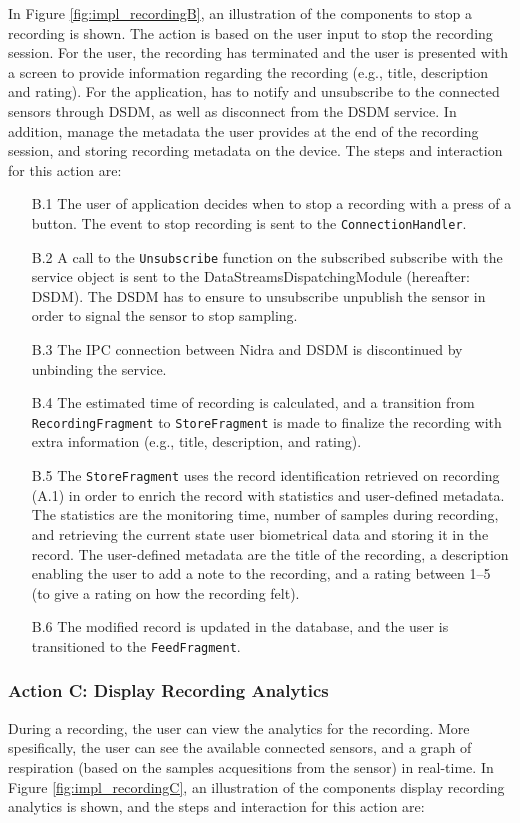 In Figure \ref{fig:impl_recordingB}, an illustration of the components to stop a recording is shown. The action is based on the user input to stop the recording session. For the user, the recording has terminated and the user is presented with a screen to provide information regarding the recording (e.g., title, description and rating). For the application, has to notify and unsubscribe to the connected sensors through DSDM, as well as disconnect from the DSDM service. In addition, manage the metadata the user provides at the end of the recording session, and storing recording metadata on the device. The steps and interaction for this action are:

\begin{itemize}
	\item[B.1] The user of application decides when to stop a recording with a press of a button. The event to stop recording is sent to the \verb|ConnectionHandler|.
	\item[B.2] A call to the \verb|Unsubscribe| function on the subscribed subscribe with the service object is sent to the DataStreamsDispatchingModule (hereafter: DSDM). The DSDM has to ensure to unsubscribe unpublish the sensor in order to signal the sensor to stop sampling. 
	\item[B.3] The IPC connection between Nidra and DSDM is discontinued by unbinding the service. 
	\item[B.4] The estimated time of recording is calculated, and a transition from \verb|RecordingFragment| to \verb|StoreFragment| is made to finalize the recording with extra information (e.g., title, description, and rating). 
	\item[B.5] The \verb|StoreFragment| uses the record identification retrieved on recording (A.1) in order to enrich the record with statistics and user-defined metadata. The statistics are the monitoring time, number of samples during recording, and retrieving the current state user biometrical data and storing it in the record. The user-defined metadata are the title of the recording, a description enabling the user to add a note to the recording, and a rating between 1--5 (to give a rating on how the recording felt). 
	\item[B.6] The modified record is updated in the database, and the user is transitioned to the \verb|FeedFragment|.
\end{itemize}


\subsubsection{Action C: Display Recording Analytics}
During a recording, the user can view the analytics for the recording. More spesifically, the user can see the available connected sensors, and a graph of respiration (based on the samples acquesitions from the sensor) in real-time. In Figure \ref{fig:impl_recordingC}, an illustration of the components display recording analytics is shown, and the steps and interaction for this action are: 

